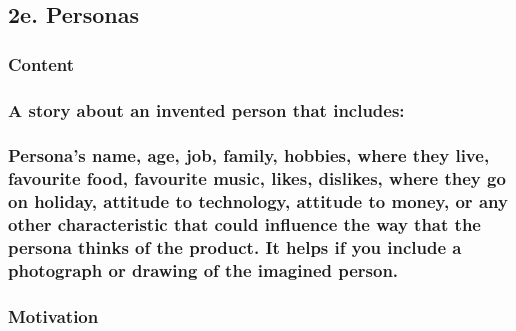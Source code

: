 \documentclass[
]{article}
\begin{document}
\hypertarget{e.-personas}{%
\subsection{2e. Personas}\label{e.-personas}}

\hypertarget{content-6}{%
\subsubsection{Content}\label{content-6}}

\hypertarget{a-story-about-an-invented-person-that-includes}{%
\subsubsection{A story about an invented person that
includes:}\label{a-story-about-an-invented-person-that-includes}}

\hypertarget{personas-name-age-job-family-hobbies-where-they-live-favourite-food-favourite-music-likes-dislikes-where-they-go-on-holiday-attitude-to-technology-attitude-to-money-or-any-other-characteristic-that-could-influence-the-way-that-the-persona-thinks-of-the-product.-it-helps-if-you-include-a-photograph-or-drawing-of-the-imagined-person.}{%
\subsubsection{Persona's name, age, job, family, hobbies, where they
live, favourite food, favourite music, likes, dislikes, where they go on
holiday, attitude to technology, attitude to money, or any other
characteristic that could influence the way that the persona thinks of
the product. It helps if you include a photograph or drawing of the
imagined
person.}\label{personas-name-age-job-family-hobbies-where-they-live-favourite-food-favourite-music-likes-dislikes-where-they-go-on-holiday-attitude-to-technology-attitude-to-money-or-any-other-characteristic-that-could-influence-the-way-that-the-persona-thinks-of-the-product.-it-helps-if-you-include-a-photograph-or-drawing-of-the-imagined-person.}}

\hypertarget{motivation-6}{%
\subsubsection{Motivation}\label{motivation-6}}
\end{document}
